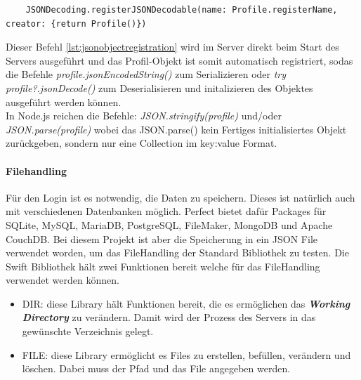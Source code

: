 
\begin{lstlisting}
	JSONDecoding.registerJSONDecodable(name: Profile.registerName, creator: {return Profile()})
\end{lstlisting}

Dieser Befehl \ref{lst:jsonobjectregistration} wird im Server direkt beim Start des Servers ausgeführt und das Profil-Objekt ist somit automatisch registriert, sodas die Befehle \textit{profile.jsonEncodedString()} zum Serializieren oder \textit{try profile?.jsonDecode()} zum Deserialisieren und initalizieren des Objektes ausgeführt werden können. 
\\
In Node.js reichen die Befehle: \textit{JSON.stringify(profile)} und/oder \textit{JSON.parse(profile)} wobei das JSON.parse() kein Fertiges initialisiertes Objekt zurückgeben, sondern nur eine Collection im key:value Format.

\paragraph{Filehandling}
Für den Login ist es notwendig, die Daten zu speichern. Dieses ist natürlich auch mit verschiedenen Datenbanken möglich. Perfect bietet dafür Packages für SQLite, MySQL, MariaDB, PostgreSQL, FileMaker, MongoDB und Apache CouchDB. Bei diesem Projekt ist aber die Speicherung in ein JSON File verwendet worden, um das FileHandling der Standard Bibliothek zu testen. Die Swift Bibliothek hält zwei Funktionen bereit welche für das FileHandling verwendet werden können. 
\begin{itemize}
\item DIR: diese Library hält Funktionen bereit, die es ermöglichen das \textit{\textbf{Working Directory}} zu verändern. Damit wird der Prozess des Servers in das gewünschte Verzeichnis gelegt.
\item FILE: diese Library ermöglicht es Files zu erstellen, befüllen, verändern und löschen. Dabei muss der Pfad und das File angegeben werden. 
\end{itemize}


